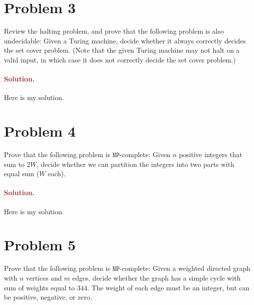 \section*{Problem 3}
Review the halting problem, and prove that the following problem is also undecidable: Given a Turing machine, decide whether it always correctly decides the set cover problem. (Note that the given Turing machine may not halt on a valid input, in which case it does not correctly decide the set cover problem.)

\paragraph{\textcolor{brown}{Solution.}}
Here is my solution.


\section*{Problem 4}
Prove that the following problem is $\mathtt{NP}$-complete: Given $n$ positive integers that sum to $2W$, decide whether we can partition the integers into two parts with equal sum ($W$ each).

\paragraph{\textcolor{brown}{Solution.}}
Here is my solution.


\section*{Problem 5}
Prove that the following problem is $\mathtt{NP}$-complete: Given a weighted directed graph with $n$ vertices and $m$ edges, decide whether the graph has a simple cycle with sum of weights equal to $344$. The weight of each edge must be an integer, but can be positive, negative, or zero.

